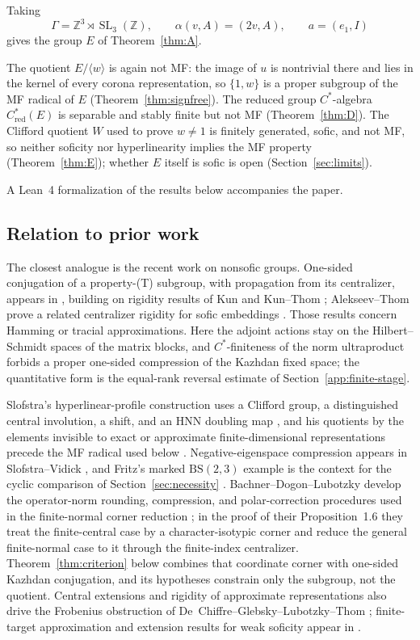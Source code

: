 \documentclass[11pt]{amsart}
\theoremstyle{definition}
\theoremstyle{remark}
\theoremstyle{plain}
\newcommand{\SL}{\operatorname{SL}}
\newcommand{\Cred}{C^*_{\mathrm{red}}}
\begin{document}
Taking
\[
 \Gamma=\mathbb Z^3\rtimes\SL_3(\mathbb Z),\qquad
 \alpha(v,A)=(2v,A),\qquad a=(e_1,I)
\]
gives the group $E$ of Theorem~\ref{thm:A}.

The quotient $E/\langle w\rangle$ is again not MF: the image of $u$ is
nontrivial there and lies in the kernel of every corona representation,
so $\{1,w\}$ is a proper subgroup of the MF radical of $E$
(Theorem~\ref{thm:signfree}).  The reduced group $C^*$-algebra
$\Cred(E)$ is separable and stably finite but not MF
(Theorem~\ref{thm:D}).  The Clifford quotient $W$ used to prove
$w\ne1$ is finitely generated, sofic, and not MF, so neither soficity
nor hyperlinearity implies the MF property (Theorem~\ref{thm:E});
whether $E$ itself is sofic is open (Section~\ref{sec:limits}).

A Lean~4 formalization of the results below accompanies the paper.

\subsection*{Relation to prior work}
The closest analogue is the recent work on nonsofic groups.  One-sided
conjugation of a property-\textup{(T)} subgroup, with propagation from
its centralizer, appears in \cite{OAI,KT}, building on rigidity results
of Kun and Kun--Thom \cite{Kun16,KT19}; Alekseev--Thom prove a related
centralizer rigidity for sofic embeddings \cite{AlekseevThom}.  Those
results concern Hamming or tracial approximations.  Here the adjoint
actions stay on the Hilbert--Schmidt spaces of the matrix blocks, and
$C^*$-finiteness of the norm ultraproduct forbids a proper one-sided
compression of the Kazhdan fixed space; the quantitative form is the
equal-rank reversal estimate of Section~\ref{app:finite-stage}.

Slofstra's hyperlinear-profile construction uses a Clifford group, a
distinguished central involution, a shift, and an HNN doubling map
\cite[Section~2 and Remark~3.3]{SlofstraProfile}, and his quotients by
the elements invisible to exact or approximate finite-dimensional
representations precede the MF radical used below
\cite[Definitions~2.5--2.7]{SlofstraCorrelations}.  Negative-eigenspace
compression appears in Slofstra--Vidick
\cite[proof of Proposition~2.7]{SlofstraVidick}, and Fritz's marked
$\mathrm{BS}(2,3)$ example is the context for the cyclic comparison of
Section~\ref{sec:necessity} \cite{Fritz,SlofstraVidick}.
Bachner--Dogon--Lubotzky develop the operator-norm rounding,
compression, and polar-correction procedures used in the finite-normal
corner reduction \cite[Lemmas~2.2--2.3, Proposition~2.4, and the proof
of Proposition~1.5]{BDL}; in the proof of their Proposition~1.6 they
treat the finite-central case by a character-isotypic corner and reduce
the general finite-normal case to it through the finite-index
centralizer.  Theorem~\ref{thm:criterion} below combines that
coordinate corner with one-sided Kazhdan conjugation, and its
hypotheses constrain only the subgroup, not the quotient.  Central
extensions and rigidity of approximate representations also drive the
Frobenius obstruction of De~Chiffre--Glebsky--Lubotzky--Thom
\cite{DGLT}; finite-target approximation and extension results for weak
soficity appear in \cite{GR,Gl19}.
\end{document}
